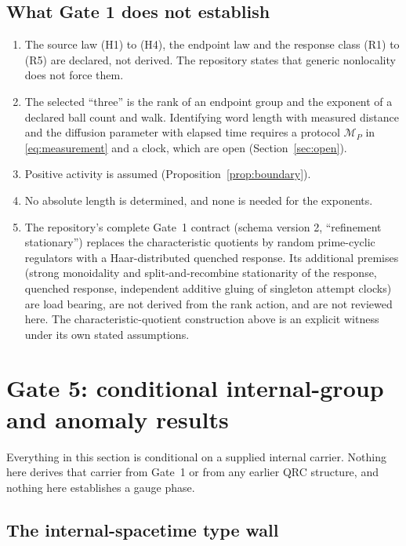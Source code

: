 \documentclass[11pt]{article}
\theoremstyle{definition}
\theoremstyle{remark}
\begin{document}
\subsection{What Gate 1 does not establish}
\label{sec:g1scope}

\begin{enumerate}
\item The source law (H1) to (H4), the endpoint law and the response class (R1) to (R5)
  are declared, not derived. The repository states that generic nonlocality does not
  force them.
\item The selected ``three'' is the rank of an endpoint group and the exponent of a
  declared ball count and walk. Identifying word length with measured distance and the
  diffusion parameter with elapsed time requires a protocol $\mathcal M_P$ in
  \eqref{eq:measurement} and a clock, which are open (Section~\ref{sec:open}).
\item Positive activity is assumed (Proposition~\ref{prop:boundary}).
\item No absolute length is determined, and none is needed for the exponents.
\item The repository's complete Gate~1 contract (schema version 2, ``refinement
  stationary'') replaces the characteristic quotients by random prime-cyclic regulators
  with a Haar-distributed quenched response. Its additional premises (strong monoidality
  and split-and-recombine stationarity of the response, quenched response, independent
  additive gluing of singleton attempt clocks) are load bearing, are not derived from the
  rank action, and are not reviewed here. The characteristic-quotient construction above
  is an explicit witness under its own stated assumptions.
\end{enumerate}

\section{Gate 5: conditional internal-group and anomaly results}
\label{sec:gate5}

Everything in this section is conditional on a supplied internal carrier. Nothing here
derives that carrier from Gate~1 or from any earlier QRC structure, and nothing here
establishes a gauge phase.

\subsection{The internal-spacetime type wall}
\end{document}

